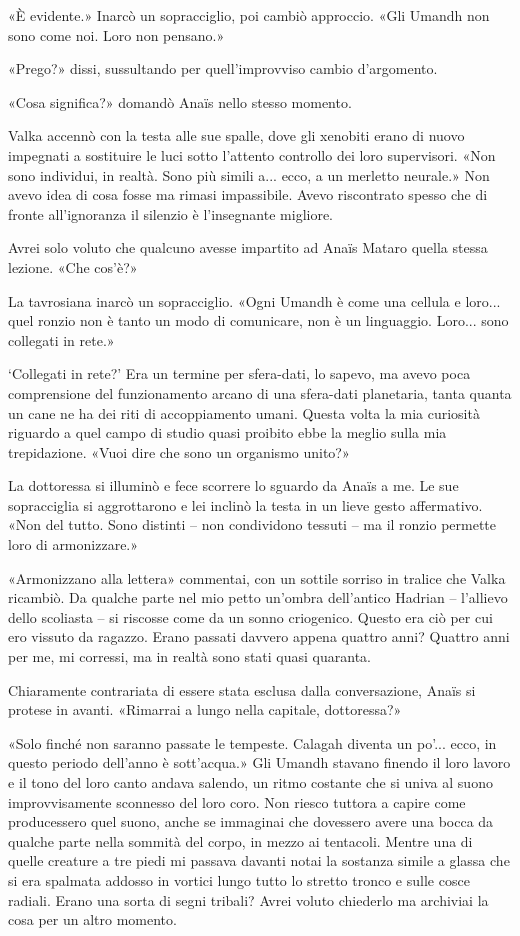 «È evidente.» Inarcò un sopracciglio, poi cambiò approccio. «Gli Umandh
non sono come noi. Loro non pensano.»

«Prego?» dissi, sussultando per quell'improvviso cambio d'argomento.

«Cosa significa?» domandò Anaïs nello stesso momento.

Valka accennò con la testa alle sue spalle, dove gli xenobiti erano di
nuovo impegnati a sostituire le luci sotto l'attento controllo dei loro
supervisori. «Non sono individui, in realtà. Sono più simili a... ecco,
a un merletto neurale.» Non avevo idea di cosa fosse ma rimasi
impassibile. Avevo riscontrato spesso che di fronte all'ignoranza il
silenzio è l'insegnante migliore.

Avrei solo voluto che qualcuno avesse impartito ad Anaïs Mataro quella
stessa lezione. «Che cos'è?»

La tavrosiana inarcò un sopracciglio. «Ogni Umandh è come una cellula e
loro... quel ronzio non è tanto un modo di comunicare, non è un
linguaggio. Loro... sono collegati in rete.»

`Collegati in rete?' Era un termine per sfera-dati, lo sapevo, ma avevo
poca comprensione del funzionamento arcano di una sfera-dati planetaria,
tanta quanta un cane ne ha dei riti di accoppiamento umani. Questa volta
la mia curiosità riguardo a quel campo di studio quasi proibito ebbe la
meglio sulla mia trepidazione. «Vuoi dire che sono un organismo unito?»

La dottoressa si illuminò e fece scorrere lo sguardo da Anaïs a me. Le
sue sopracciglia si aggrottarono e lei inclinò la testa in un lieve
gesto affermativo. «Non del tutto. Sono distinti -- non condividono
tessuti -- ma il ronzio permette loro di armonizzare.»

«Armonizzano alla lettera» commentai, con un sottile sorriso in tralice
che Valka ricambiò. Da qualche parte nel mio petto un'ombra dell'antico
Hadrian -- l'allievo dello scoliasta -- si riscosse come da un sonno
criogenico. Questo era ciò per cui ero vissuto da ragazzo. Erano passati
davvero appena quattro anni? Quattro anni per me, mi corressi, ma in
realtà sono stati quasi quaranta.

Chiaramente contrariata di essere stata esclusa dalla conversazione,
Anaïs si protese in avanti. «Rimarrai a lungo nella capitale,
dottoressa?»

«Solo finché non saranno passate le tempeste. Calagah diventa un po'...
ecco, in questo periodo dell'anno è sott'acqua.» Gli Umandh stavano
finendo il loro lavoro e il tono del loro canto andava salendo, un ritmo
costante che si univa al suono improvvisamente sconnesso del loro coro.
Non riesco tuttora a capire come producessero quel suono, anche se
immaginai che dovessero avere una bocca da qualche parte nella sommità
del corpo, in mezzo ai tentacoli. Mentre una di quelle creature a tre
piedi mi passava davanti notai la sostanza simile a glassa che si era
spalmata addosso in vortici lungo tutto lo stretto tronco e sulle cosce
radiali. Erano una sorta di segni tribali? Avrei voluto chiederlo ma
archiviai la cosa per un altro momento.

